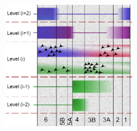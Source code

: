 \begin{figure}[!ht]
	\centering
	\includegraphics[width=0.5\textwidth, clip=true]{./Chapters/01_Introduction/Images/LaminarProcessing}
	\caption{\cite{Shipp2013} }
	\label{fig:layerprocessing}
\end{figure}